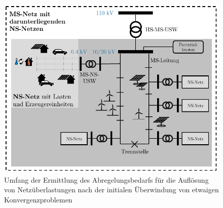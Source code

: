 \begin{figure}[H]
    \centering
    \includegraphics[width=\textwidth]{Bilder/scope_power_flow_kh_cropped}
    \caption[Umfang der Ermittlung des Abregelungsbedarfs für die Auflösung von Netzüberlastungen nach der initialen Überwindung von etwaigen Konvergenzproblemen]{Umfang der Ermittlung des Abregelungsbedarfs für die Auflösung von Netzüberlastungen nach der initialen Überwindung von etwaigen Konvergenzproblemen \cite{Schachler}}\label{fig:scope_curtailment}
\end{figure}